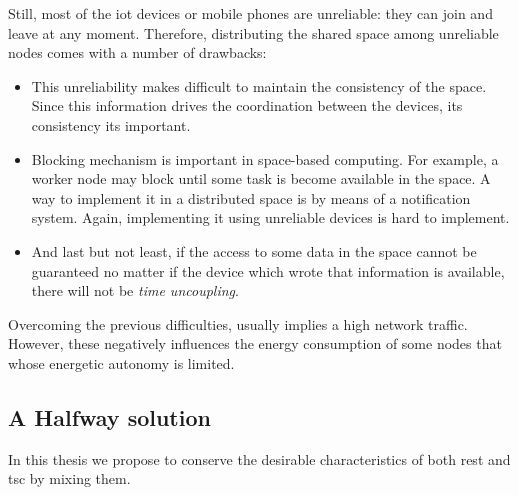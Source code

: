 Still, most of the \ac{iot} devices or mobile phones are unreliable: they can join and leave at any moment.
Therefore, distributing the shared space among unreliable nodes comes with a number of drawbacks:
\begin{itemize}
  \item This unreliability makes difficult to maintain the consistency of the space. %
        Since this information drives the coordination between the devices, its consistency its important.
  \item Blocking mechanism is important in space-based computing.
        For example, a worker node may block until some task is become available in the space.
        A way to implement it in a distributed space is by means of a notification system.
        Again, implementing it using unreliable devices is hard to implement. %
  \item And last but not least, if the access to some data in the space cannot be guaranteed no matter if the device which wrote that information is available, there will not be \emph{time uncoupling}.
\end{itemize}
Overcoming the previous difficulties, usually implies a high network traffic.
However, these negatively influences the energy consumption of some nodes that whose energetic autonomy is limited.


\subsection{A Halfway solution}

In this thesis we propose to conserve the desirable characteristics of both \ac{rest} and \ac{tsc} by mixing them.

